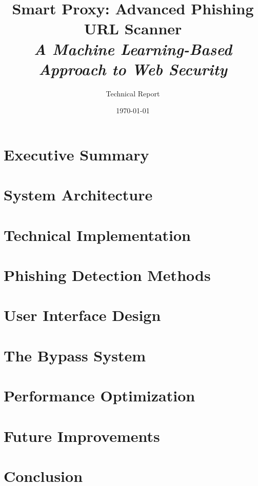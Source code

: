 \documentclass[12pt,a4paper]{report}
\title{
    \vspace{2cm}
    \Huge \textbf{Smart Proxy: Advanced Phishing URL Scanner} \\
    \vspace{0.5cm}
    \Large \textit{A Machine Learning-Based Approach to Web Security}
    \vspace{2cm}
}
\author{\Large Technical Report}
\date{\today}
\begin{document}
\maketitle
\tableofcontents
\newpage

\chapter{Executive Summary}


\chapter{System Architecture}


\chapter{Technical Implementation}


\chapter{Phishing Detection Methods}


\chapter{User Interface Design}


\chapter{The Bypass System}


\chapter{Performance Optimization}


\chapter{Future Improvements}


\chapter{Conclusion}

\end{document}
